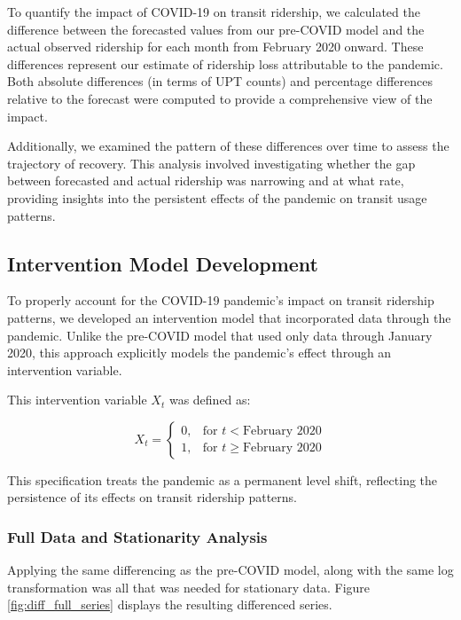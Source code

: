 \documentclass[11pt]{article}
\begin{document}
To quantify the impact of COVID-19 on transit ridership, we calculated the difference between the forecasted values from our pre-COVID model and the actual observed ridership for each month from February 2020 onward. These differences represent our estimate of ridership loss attributable to the pandemic. Both absolute differences (in terms of UPT counts) and percentage differences relative to the forecast were computed to provide a comprehensive view of the impact.

Additionally, we examined the pattern of these differences over time to assess the trajectory of recovery. This analysis involved investigating whether the gap between forecasted and actual ridership was narrowing and at what rate, providing insights into the persistent effects of the pandemic on transit usage patterns.

\subsection{Intervention Model Development}

To properly account for the COVID-19 pandemic's impact on transit ridership patterns, we developed an intervention model that incorporated data through the pandemic. Unlike the pre-COVID model that used only data through January 2020, this approach explicitly models the pandemic's effect through an intervention variable.

This intervention variable $X_t$ was defined as:

\begin{equation}
X_t = 
\begin{cases}
0, & \text{for } t < \text{February 2020} \\
1, & \text{for } t \geq \text{February 2020}
\end{cases}
\end{equation}

This specification treats the pandemic as a permanent level shift, reflecting the persistence of its effects on transit ridership patterns.

\subsubsection{Full Data and Stationarity Analysis}

Applying the same differencing as the pre-COVID model, along with the same log transformation was all that was needed for stationary data. Figure \ref{fig:diff_full_series} displays the resulting differenced series.
\end{document}
